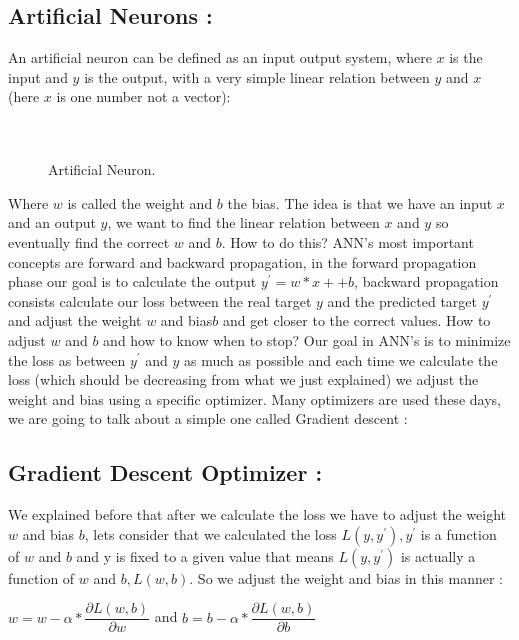 \documentclass[10pt,a4paper]{article}
\begin{document}
\subsection{Artificial Neurons :}
An artificial neuron can be defined as an input output system, where $ x $ is the input and $ y $ is the output, with a very simple linear relation between $ y $ and $ x $ (here $ x $ is one number not a vector):\\\\\\
\begin{figure}[H]
\centering
{}
\caption{Artificial Neuron.}
\end{figure}
Where $ w $ is called the weight and $ b $ the bias. The idea is that we have an input $ x $ and an output $ y $, we want to find the linear relation between $ x $ and $ y $ so eventually find the correct $ w $ and $ b $. How to do this? ANN's most important concepts are forward and backward propagation, in the forward propagation phase our goal is to calculate the output $ y^{\prime} = w*x ++ b $, backward propagation consists calculate our loss between the real target $ y $ and the predicted target $ y^{\prime} $ and adjust the weight $ w $ and bias$ b $ and get closer to the correct values. How to adjust $ w $ and $ b $ and how to know when to stop? Our goal in ANN's is to minimize the loss as between $ y^{\prime} $ and $ y $ as much as possible and each time we calculate the loss (which should be decreasing from what we just explained) we adjust the weight and bias using a specific optimizer. Many optimizers are used these days, we are going to talk about a simple one called Gradient descent :
\subsection{Gradient Descent Optimizer :}
We explained before that after we calculate the loss we have to adjust the weight $ w $ and bias $ b $, lets consider that we calculated the loss $ L(y,y^{\prime}), y^{\prime} $ is a function of $ w $ and $ b $ and y is fixed to a given value that means $ L(y,y^{\prime}) $ is actually a function of $ w $ and $ b, L(w,b) $. So we adjust the weight and bias in this manner :\\
\begin{center}
$ w = w - \alpha*\dfrac{\partial L(w,b)}{\partial w} $ \hspace{1cm} and \hspace{1cm} $ b = b - \alpha*\dfrac{\partial L(w,b)}{\partial b} $
\end{center} 
\end{document}

